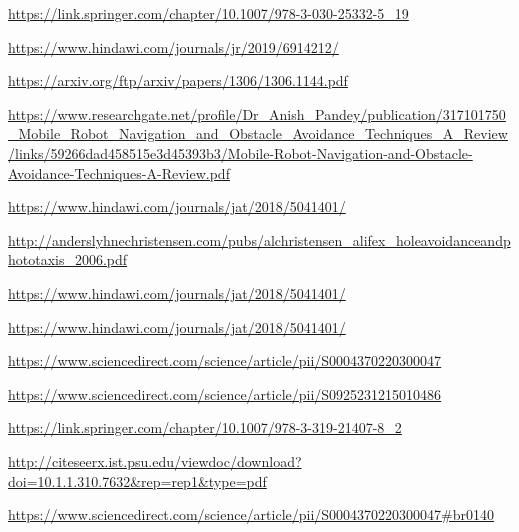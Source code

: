 \begin{thebibliography}{99}

\url{https://link.springer.com/chapter/10.1007/978-3-030-25332-5_19}

\url{https://www.hindawi.com/journals/jr/2019/6914212/}

\url{https://arxiv.org/ftp/arxiv/papers/1306/1306.1144.pdf}

\url{https://www.researchgate.net/profile/Dr_Anish_Pandey/publication/317101750_Mobile_Robot_Navigation_and_Obstacle_Avoidance_Techniques_A_Review/links/59266dad458515e3d45393b3/Mobile-Robot-Navigation-and-Obstacle-Avoidance-Techniques-A-Review.pdf
}

\url{https://www.hindawi.com/journals/jat/2018/5041401/}

\url{http://anderslyhnechristensen.com/pubs/alchristensen_alifex_holeavoidanceandphototaxis_2006.pdf}


\url{https://www.hindawi.com/journals/jat/2018/5041401/}


\url{https://www.hindawi.com/journals/jat/2018/5041401/}


\url{https://www.sciencedirect.com/science/article/pii/S0004370220300047}

\url{https://www.sciencedirect.com/science/article/pii/S0925231215010486}

\url{https://link.springer.com/chapter/10.1007/978-3-319-21407-8_2}

\url{http://citeseerx.ist.psu.edu/viewdoc/download?doi=10.1.1.310.7632&rep=rep1&type=pdf}

\url{https://www.sciencedirect.com/science/article/pii/S0004370220300047#br0140}

\end{thebibliography}




